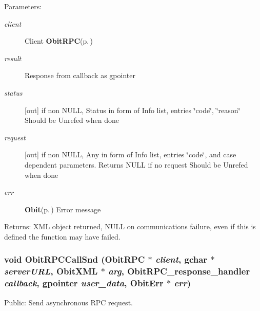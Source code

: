 \begin{Desc}
\item[Parameters:]
\begin{description}
\item[{\em client}]Client {\bf Obit\-RPC}{\rm (p.\,\pageref{structObitRPC})} \item[{\em result}]Response from callback as gpointer \item[{\em status}][out] if non NULL, Status in form of Info list, entries \char`\"{}code\char`\"{}, \char`\"{}reason\char`\"{} Should be Unrefed when done \item[{\em request}][out] if non NULL, Any in form of Info list, entries \char`\"{}code\char`\"{}, and case dependent parameters. Returns NULL if no request Should be Unrefed when done \item[{\em err}]{\bf Obit}{\rm (p.\,\pageref{structObit})} Error message \end{description}
\end{Desc}
\begin{Desc}
\item[Returns:]XML object returned, NULL on communications failure, even if this is defined the function may have failed. \end{Desc}
\subsubsection{\setlength{\rightskip}{0pt plus 5cm}void Obit\-RPCCall\-Snd ({\bf Obit\-RPC} $\ast$ {\em client}, gchar $\ast$ {\em server\-URL}, {\bf Obit\-XML} $\ast$ {\em arg}, {\bf Obit\-RPC\_\-response\_\-handler} {\em callback}, gpointer {\em user\_\-data}, {\bf Obit\-Err} $\ast$ {\em err})}\label{ObitRPC_8c_a12}


Public: Send asynchronous RPC request. 

